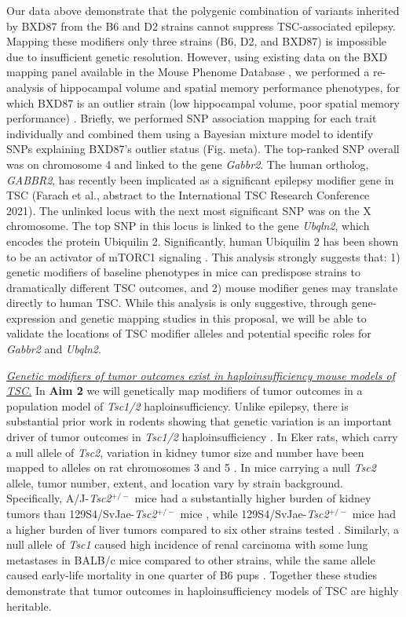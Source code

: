 \documentclass[
  12pt,
]{article}
\begin{document}
Our data above demonstrate that the polygenic combination of variants
inherited by BXD87 from the B6 and D2 strains cannot suppress
TSC-associated epilepsy. Mapping these modifiers only three strains (B6,
D2, and BXD87) is impossible due to insufficient genetic resolution.
However, using existing data on the BXD mapping panel available in the
Mouse Phenome Database \citep{31696236}, we performed a re-analysis of
hippocampal volume and spatial memory performance phenotypes, for which
BXD87 is an outlier strain (low hippocampal volume, poor spatial memory
performance) \citep{26449520}. Briefly, we performed SNP association
mapping for each trait individually and combined them using a Bayesian
mixture model \citep{22396665} to identify SNPs explaining BXD87's
outlier status (Fig. meta). The top-ranked SNP overall was on chromosome
4 and linked to the gene \textit{Gabbr2}. The human ortholog,
\textit{GABBR2}, has recently been implicated as a significant epilepsy
modifier gene in TSC (Farach et al., abstract to the International TSC
Research Conference 2021). The unlinked locus with the next most
significant SNP was on the X chromosome. The top SNP in this locus is
linked to the gene \textit{Ubqln2}, which encodes the protein Ubiquilin
2. Significantly, human Ubiquilin 2 has been shown to be an activator of
mTORC1 signaling \citep{26740621, 30804504}. This analysis strongly
suggests that: 1) genetic modifiers of baseline phenotypes in mice can
predispose strains to dramatically different TSC outcomes, and 2) mouse
modifier genes may translate directly to human TSC. While this analysis
is only suggestive, through gene-expression and genetic mapping studies
in this proposal, we will be able to validate the locations of TSC
modifier alleles and potential specific roles for \textit{Gabbr2} and
\textit{Ubqln2}.

\textit{\underline{Genetic modifiers of tumor outcomes exist in haploinsufficiency mouse models of TSC.}}
In \textbf{Aim 2} we will genetically map modifiers of tumor outcomes in
a population model of \textit{Tsc1/2} haploinsufficiency. Unlike
epilepsy, there is substantial prior work in rodents showing that
genetic variation is an important driver of tumor outcomes in
\textit{Tsc1/2} haploinsufficiency \cite{20235887}. In Eker rats, which
carry a null allele of \textit{Tsc2}, variation in kidney tumor size and
number have been mapped to alleles on rat chromosomes 3 \cite{11735216}
and 5 \cite{14654943}. In mice carrying a null \textit{Tsc2} allele,
tumor number, extent, and location vary by strain background.
Specifically, A/J-\textit{Tsc2}\(^{+/-}\) mice had a substantially
higher burden of kidney tumors than 129S4/SvJae-\textit{Tsc2}\(^{+/-}\)
mice \cite{10491404}, while 129S4/SvJae-\textit{Tsc2}\(^{+/-}\) mice had
a higher burden of liver tumors compared to six other strains tested
\cite{20235887}. Similarly, a null allele of \textit{Tsc1} caused high
incidence of renal carcinoma with some lung metastases in BALB/c mice
compared to other strains, while the same allele caused early-life
mortality in one quarter of B6 pups \cite{15888477}. Together these
studies demonstrate that tumor outcomes in haploinsufficiency models of
TSC are highly heritable.
\end{document}
